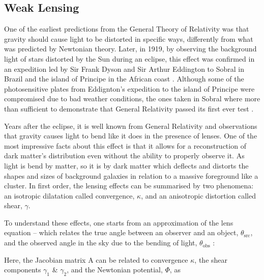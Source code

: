 \subsection{Weak Lensing}
One of the earliest predictions from the General Theory of Relativity was that gravity should cause light to be distorted in specific ways, differently from what was predicted by Newtonian theory. Later, in 1919, by observing the background light of stars distorted by the Sun during an eclipse, this effect was confirmed in an expedition led by Sir Frank Dyson and Sir Arthur Eddington to Sobral in Brazil and the island of Principe in the African coast \citep{Dyson291}. Although some of the photosensitive plates from Eddignton's expedition to the island of Principe were compromised due to bad weather conditions, the ones taken in Sobral where more than sufficient to demonstrate that General Relativity passed its first ever test \citep{2007arXiv0709.0685K}.


\qquad Years after the eclipse, it is well known from General Relativity and observations that gravity causes light to bend like it does in the presence of lenses. One of the most impressive facts about this effect is that it allows for a reconstruction of dark matter's distribution even without the ability to properly observe it. As light is bend by matter, so it is by dark matter which deflects and distorts the shapes and sizes of background galaxies in relation to a massive foreground like a cluster. In first order, the lensing effects can be summarised by two phenomena: an isotropic dilatation called convergence, $\kappa$, and an anisotropic distortion called shear, $\gamma$. 

\qquad To understand these effects, one starts from an approximation of the lens equation -- which relates the true angle between an observer and an object, $\theta_{\text{src}}$, and the observed angle in the sky due to the bending of light, $\theta_{\text{obs}}$ \citep[][p. 296]{dods}:

Here, the Jacobian matrix A can be related to convergence $\kappa$, the shear components $\gamma_1$ \& $\gamma_2$, and the Newtonian potential, $\Phi$, as


